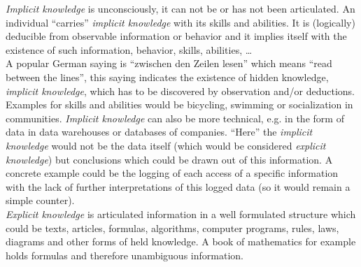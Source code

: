 \documentclass[10pt,a4paper]{article}
\begin{document}
		
		\noindent \textit{Implicit knowledge} is unconsciously, it can not be or has not been articulated. An individual \enquote{carries} \textit{implicit knowledge} with its skills and abilities. It is (logically) deducible from observable information or behavior and it implies itself with the existence of such information, behavior, skills, abilities, \dots
		\\
		A popular German saying is \enquote{zwischen den Zeilen lesen} which means \enquote{read between the lines}, this saying indicates the existence of hidden knowledge, \textit{implicit knowledge}, which has to be discovered by observation and/or deductions.
		\\
		Examples for skills and abilities would be bicycling, swimming or socialization in communities. \textit{Implicit knowledge} can also be more technical, e.g. in the form of data in data warehouses or databases of companies. \enquote{Here} the \textit{implicit knowledge} would not be the data itself (which would be considered \textit{explicit knowledge}) but conclusions which could be drawn out of this information. A concrete example could be the logging of each access of a specific information with the lack of further interpretations of this logged data (so it would remain a simple counter).
		\\
		
		\noindent \textit{Explicit knowledge} is articulated information in a well formulated structure which could be texts, articles, formulas, algorithms, computer programs, rules, laws, diagrams and other forms of held knowledge. A book of mathematics for example holds formulas and therefore unambiguous information. 
		\\
		
\end{document}
